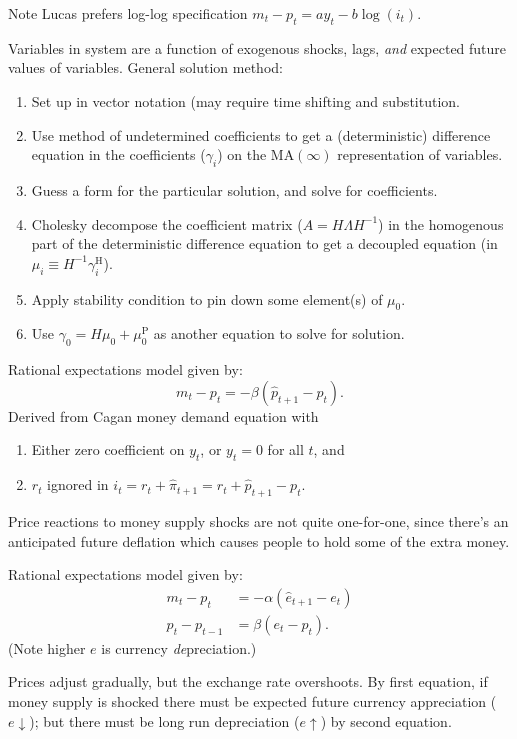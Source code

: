 \documentclass[8pt,letterpaper, landscape]{extarticle} %
\begin{document}
\begin{multicols}{3}
\begin{description}
Note Lucas prefers log-log specification $ m_t - p_t = a y_t - b \log(i_t) $.

 Variables in system are a function of exogenous shocks, lags, \textit{and} expected future values of variables. General solution method:
\begin{enumerate}
\item Set up in vector notation (may require time shifting and substitution.
\item Use method of undetermined coefficients to get a (deterministic) difference equation in the coefficients ($ \gamma_i $) on the $ \text{MA}(\infty) $ representation of variables.
\item Guess a form for the particular solution, and solve for coefficients.
\item Cholesky decompose the coefficient matrix ($ A = H \Lambda H^{-1} $) in the homogenous part of the deterministic difference equation to get a decoupled equation (in $ \mu_i \equiv H^{-1} \gamma_i^{\text{H}} $).
\item Apply stability condition to pin down some element(s) of $ \mu_0 $.
\item Use $ \gamma_0 = H \mu_0 + \mu_0^{\text{P}} $ as another equation to solve for solution.
\end{enumerate}

 Rational expectations model given by:
$$ m_t - p_t = - \beta ( \hat{p}_{t+1} - p_t ). $$
Derived from Cagan money demand equation with
\begin{enumerate}
\item Either zero coefficient on $ y_t $, or $ y_t = 0 $ for all $ t $, and
\item $ r_t $ ignored in $ i_t = r_t + \hat{\pi}_{t+1} = r_t + \hat{p}_{t+1} - p_t $.
\end{enumerate}
Price reactions to money supply shocks are not quite one-for-one, since there's an anticipated future deflation which causes people to hold some of the extra money.

 Rational expectations model given by:
\begin{align*}
m_t - p_t &= - \alpha ( \hat{e}_{t+1} - e_t ) \\
p_t - p_{t-1} &= \beta (e_t - p_t) .
\end{align*}
(Note higher $ e $ is currency \textit{de}preciation.)

Prices adjust gradually, but the exchange rate overshoots. By first equation, if money supply is shocked there must be expected future currency appreciation ($ e \downarrow $); but there must be long run depreciation ($ e \uparrow $) by second equation.


\end{description}
\end{multicols}
\end{document}
